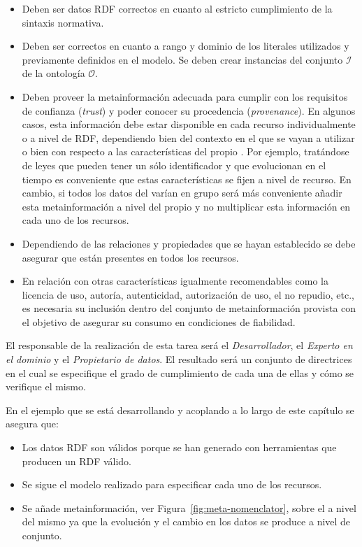 \begin{itemize}
 \item Deben ser datos RDF correctos en cuanto al estricto cumplimiento de la sintaxis normativa.
 \item Deben ser correctos en cuanto a rango y dominio de los literales
utilizados y previamente definidos en el modelo. Se deben crear instancias del conjunto
$\mathcal{I}$ de la ontología $\mathcal{O}$.
\item Deben proveer la metainformación adecuada para cumplir con los requisitos de confianza (\textit{trust})
y poder conocer su procedencia (\textit{provenance}). En algunos casos, esta información debe estar disponible
en cada recurso individualmente o a nivel de \dataset RDF, dependiendo bien del contexto en el que se vayan
a utilizar o bien con respecto a las características del propio \dataset. Por ejemplo, tratándose de leyes que pueden
tener un sólo identificador y que evolucionan en el tiempo es conveniente que estas características
se fijen a nivel de recurso. En cambio, si todos los datos del \dataset varían en grupo será más conveniente
añadir esta metainformación a nivel del propio \dataset y no multiplicar esta información en cada
uno de los recursos.
\item Dependiendo de las relaciones y propiedades que se hayan establecido se debe asegurar que 
están presentes en todos los recursos.
\item En relación con otras características igualmente recomendables como la licencia de uso, autoría, autenticidad, autorización de uso, el no repudio, etc., 
es necesaria su inclusión dentro del conjunto de metainformación provista con el objetivo de asegurar su consumo en condiciones de fiabilidad.
\end{itemize}

El responsable de la realización de esta tarea será el \textit{Desarrollador}, el \textit{Experto en el dominio} y el \textit{Propietario de datos}. 
El resultado será un conjunto de directrices en el cual se especifique el grado de cumplimiento de cada una de ellas y cómo se verifique 
el mismo.

En el ejemplo que se está desarrollando y acoplando a lo largo de este capítulo se asegura que:
\begin{itemize}
 \item Los datos RDF son válidos porque se han generado con herramientas que producen un RDF válido.
 \item Se sigue el modelo realizado para especificar cada uno de los recursos.
 \item Se añade metainformación, ver Figura~\ref{fig:meta-nomenclator}, sobre el \dataset a nivel del mismo ya que la evolución
y el cambio en los datos se produce a nivel de conjunto.
\end{itemize}

